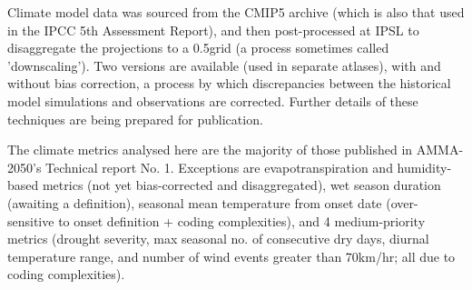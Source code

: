 Climate model data was sourced from the CMIP5 archive (which is also that used in the IPCC 5th Assessment Report), and then post-processed at IPSL to disaggregate the projections to a 0.5\textdegree grid (a process sometimes called 'downscaling'). Two versions are available (used in separate atlases), with and without bias correction, a process by which discrepancies between the historical model simulations and observations are corrected. Further details of these techniques are being prepared for publication.

The climate metrics analysed here are the majority of those published in AMMA-2050's Technical report No. 1. Exceptions are evapotranspiration and humidity-based metrics (not yet bias-corrected and disaggregated), wet season duration (awaiting a definition), seasonal mean temperature from onset date (over-sensitive to onset definition + coding complexities), and 4 medium-priority metrics (drought severity, max seasonal no. of consecutive dry days, diurnal temperature range, and number of wind events greater than 70km/hr; all due to coding complexities).
